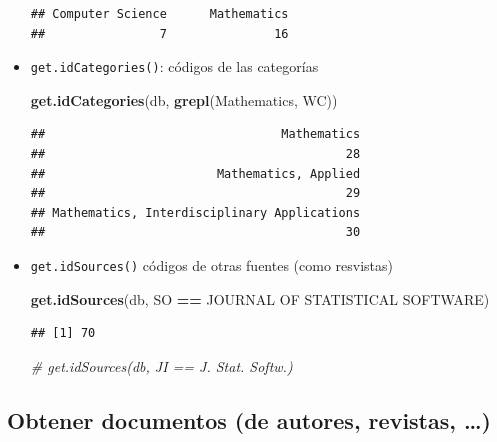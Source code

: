 \documentclass[
]{book}
\newenvironment{Shaded}{\begin{snugshade}}{\end{snugshade}}
\newcommand{\CommentTok}[1]{\textcolor[rgb]{0.56,0.35,0.01}{\textit{#1}}}
\newcommand{\FunctionTok}[1]{\textcolor[rgb]{0.13,0.29,0.53}{\textbf{#1}}}
\newcommand{\NormalTok}[1]{#1}
\newcommand{\SpecialCharTok}[1]{\textcolor[rgb]{0.81,0.36,0.00}{\textbf{#1}}}
\newcommand{\StringTok}[1]{\textcolor[rgb]{0.31,0.60,0.02}{#1}}
\begin{document}
\begin{itemize}
\begin{verbatim}
## Computer Science      Mathematics 
##                7               16
\end{verbatim}
\item
  \texttt{get.idCategories()}: códigos de las categorías

\begin{Shaded}
\begin{Highlighting}[]
\FunctionTok{get.idCategories}\NormalTok{(db, }\FunctionTok{grepl}\NormalTok{(}\StringTok{\textquotesingle{}Mathematics\textquotesingle{}}\NormalTok{, WC))}
\end{Highlighting}
\end{Shaded}

\begin{verbatim}
##                                 Mathematics 
##                                          28 
##                        Mathematics, Applied 
##                                          29 
## Mathematics, Interdisciplinary Applications 
##                                          30
\end{verbatim}
\item
  \texttt{get.idSources()} códigos de otras fuentes (como resvistas)

\begin{Shaded}
\begin{Highlighting}[]
\FunctionTok{get.idSources}\NormalTok{(db, SO }\SpecialCharTok{==} \StringTok{\textquotesingle{}JOURNAL OF STATISTICAL SOFTWARE\textquotesingle{}}\NormalTok{)}
\end{Highlighting}
\end{Shaded}

\begin{verbatim}
## [1] 70
\end{verbatim}

\begin{Shaded}
\begin{Highlighting}[]
\CommentTok{\# get.idSources(db, JI == \textquotesingle{}J. Stat. Softw.\textquotesingle{})}
\end{Highlighting}
\end{Shaded}
\end{itemize}

\hypertarget{obtener-documentos-de-autores-revistas}{%
\subsection{Obtener documentos (de autores, revistas, \ldots)}\label{obtener-documentos-de-autores-revistas}}
\end{document}
